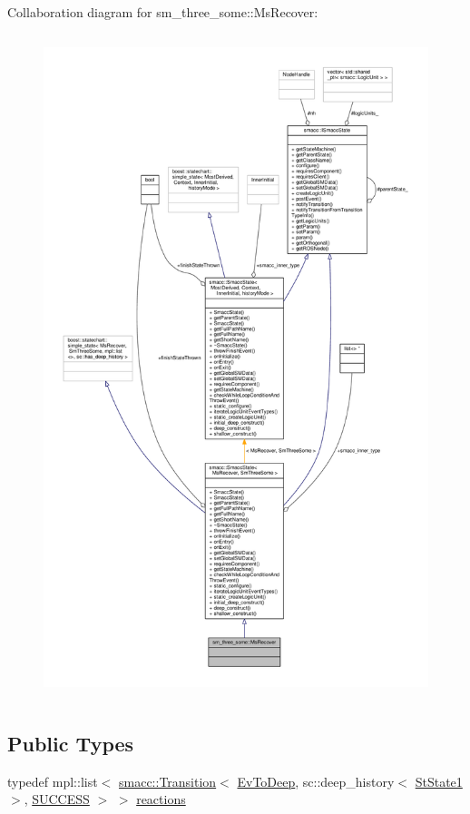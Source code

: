 Collaboration diagram for sm\+\_\+three\+\_\+some\+:\+:Ms\+Recover\+:\nopagebreak
\begin{figure}[H]
\begin{center}
\leavevmode
\includegraphics[height=550pt]{classsm__three__some_1_1MsRecover__coll__graph}
\end{center}
\end{figure}
\subsection*{Public Types}
\begin{DoxyCompactItemize}
\item 
typedef mpl\+::list$<$ \hyperlink{classsmacc_1_1Transition}{smacc\+::\+Transition}$<$ \hyperlink{structsm__three__some_1_1EvToDeep}{Ev\+To\+Deep}, sc\+::deep\+\_\+history$<$ \hyperlink{structsm__three__some_1_1StState1}{St\+State1} $>$, \hyperlink{classSUCCESS}{S\+U\+C\+C\+E\+SS} $>$ $>$ \hyperlink{classsm__three__some_1_1MsRecover_a7cacea2d23f9c8ef0d5f93cff1106ebd}{reactions}
\end{DoxyCompactItemize}
